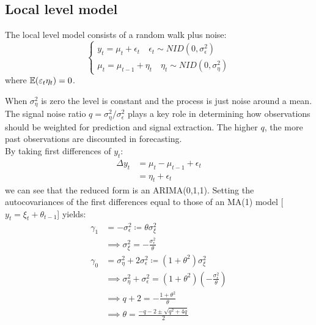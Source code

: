 \documentclass[DIV=14,titlepage=false]{scrreprt}
\begin{document}
\subsection{Local level model}
\begin{definition}
    The local level model consists of a random walk plus noise:
\[
    \begin{cases*}
        y_t = \mu_t + \epsilon_t \quad \epsilon_t \sim NID(0,\sigma^2_\epsilon)\\
        \mu_t = \mu_{t-1} + \eta_t \quad \eta_t \sim NID(0,\sigma^2_\eta)
    \end{cases*}
\]
where $\mathbb{E}(\varepsilon_t \eta_t) = 0$.
\end{definition}
When $\sigma^2_\eta$ is zero the level is constant and the process is just noise around a mean. The signal noise ratio $q = \sigma^2_\eta / \sigma^2_\epsilon$ plays a key role in determining how observations should be weighted for prediction and signal extraction. The higher $q$, the more past observations are discounted in forecasting.\\
By taking first differences of $y_t$:
\begin{align*}
    \Delta y_t &= \mu_t - \mu_{t-1} + \epsilon_t\\
    &= \eta_t + \epsilon_t
\end{align*}
we can see that the reduced form is an ARIMA(0,1,1). Setting the autocovariances of the first differences equal to those of an MA(1) model [$y_t = \xi_t + \theta_{t-1}$] yields:
\begin{align*}
    \gamma_1 &= -\sigma^2_\epsilon \coloneq \theta \sigma^2_\xi\\
    & \implies \sigma^2_\xi = -\frac{\sigma^2_\epsilon}{\theta}\\    
    \gamma_0 &= \sigma^2_\eta + 2 \sigma^2_\epsilon \coloneq (1+\theta^2)\sigma^2_\xi\\
    & \implies \sigma^2_\eta + \sigma^2_\epsilon = (1+\theta^2)\left(-\frac{\sigma^2_\epsilon}{\theta}\right)\\
    & \implies q +2 = -\frac{1+\theta^2}{\theta}\\
    & \implies \theta = \frac{-q-2 \pm \sqrt{q^2+4q}}{2}
\end{align*}
\end{document}
